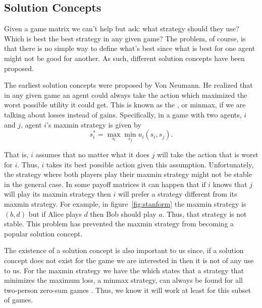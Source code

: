 
\subsection{Solution Concepts}

Given a game matrix we can't help but ask: what strategy should they
use? Which is best the best strategy in any given game? The problem,
of course, is that there is no simple way to define what's best since
what is best for one agent might not be good for another. As such,
different solution concepts have been proposed.

The earliest solution concepts were proposed by Von Neumann. He
realized that in any given game an agent could always take the action
which maximized the worst possible utility it could get. This is known
as the , or minmax, if we are talking about losses
instead of gains. Specifically, in a game with two agents, $i$ and
$j$, agent $i$'s maxmin strategy is given by
\begin{equation}
  \label{eq:maxmin}
  s_i^* = \max_{s_i} \min_{s_j} u_i(s_i,s_j).
\end{equation}

That is, $i$ assumes that no matter what it does $j$ will take the
action that is worst for $i$. Thus, $i$ takes its best possible action
given this assumption. Unfortunately, the strategy where both players
play their maxmin strategy might not be stable in the general case. In
some payoff matrices it can happen that if $i$ knows that $j$ will
play its maxmin strategy then $i$ will prefer a strategy different
from its maxmin strategy. For example, in figure~\ref{fig:stanform}
the maxmin strategy is $(b,d)$ but if Alice plays $d$ then Bob should
play $a$. Thus, that strategy is not stable. This problem has
prevented the maxmin strategy from becoming a popular solution
concept.

The existence of a solution concept is also important to us since, if
a solution concept does not exist for the game we are interested in
then it is not of any use to us. For the maxmin strategy we have the
 which states that a strategy that minimizes the
maximum loss, a minmax strategy, can always be found for all
two-person zero-sum games \cite{neumann28a}. Thus, we know it will
work at least for this subset of games.


